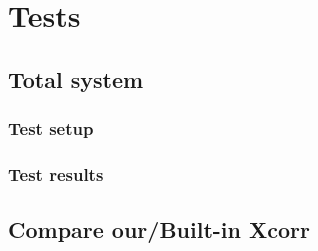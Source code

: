 \chapter{Tests}
\section{Total system}
\subsection{Test setup}
\subsection{Test results}
\section{Compare our/Built-in Xcorr}